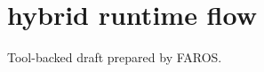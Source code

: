 \documentclass{article}
\begin{document}
\section*{hybrid runtime flow}
Tool-backed draft prepared by FAROS.
\end{document}
